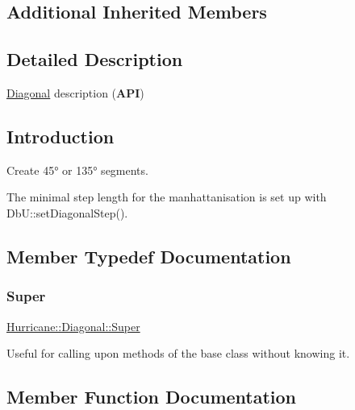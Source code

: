 \subsection*{Additional Inherited Members}


\subsection{Detailed Description}
\mbox{\hyperlink{classHurricane_1_1Diagonal}{Diagonal}} description ({\bfseries A\+PI}) 

\hypertarget{classHurricane_1_1Diagonal_secDiagonalIntro}{}\subsection{Introduction}\label{classHurricane_1_1Diagonal_secDiagonalIntro}
Create 45° or 135° segments.

The minimal step length for the manhattanisation is set up with Db\+U\+::set\+Diagonal\+Step(). 

\subsection{Member Typedef Documentation}
\mbox{\label{classHurricane_1_1Diagonal_aef5120a04b3b4db78b118e8c5daade90}} 
\subsubsection{\texorpdfstring{Super}{Super}}
{\footnotesize\ttfamily \mbox{\hyperlink{classHurricane_1_1Diagonal_aef5120a04b3b4db78b118e8c5daade90}{Hurricane\+::\+Diagonal\+::\+Super}}}

Useful for calling upon methods of the base class without knowing it. 

\subsection{Member Function Documentation}
\mbox{\label{classHurricane_1_1Diagonal_a83cd4332e78515e2c3745fd017e7441f}} 
